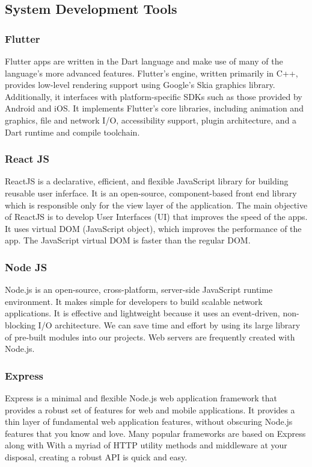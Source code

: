 \newpage
\subsection{System Development Tools}
\subsubsection{Flutter}
Flutter apps are written in the Dart language and make use of many of the language's more advanced features. Flutter's engine, written primarily
in C++, provides low-level rendering support using Google's Skia graphics library. \cite{Flutter}Additionally, it interfaces with platform-specific SDKs such as those provided by Android and iOS. It implements Flutter's core libraries, including animation and graphics, file and network I/O, accessibility support, plugin architecture, and a Dart runtime and compile toolchain.

\subsubsection{React JS}
ReactJS is a declarative, efficient, and flexible JavaScript library for building reusable user inferface. \cite{ReactJS} It is an open-source, component-based front end library which is responsible only for the view layer of the application. The main objective of ReactJS is to develop User Interfaces (UI) that improves the speed of the apps. It uses virtual DOM (JavaScript object), which improves the performance of the app. The JavaScript virtual DOM is faster than the regular DOM.

\subsubsection{Node JS}
Node.js is an open-source, cross-platform, server-side JavaScript runtime environment. It makes simple for developers to build scalable network applications. It is effective and lightweight because it uses an event-driven, non-blocking I/O architecture. We can save time and effort by using its large library of pre-built modules into our projects. Web servers are frequently created with Node.js.

\subsubsection{Express}
Express is a minimal and flexible Node.js web application framework that provides a robust set of features for web and mobile applications. It provides a thin layer of fundamental web application features, without obscuring Node.js features that you know and love. Many popular frameworks are based on Express along with With a myriad of HTTP utility methods and middleware at your disposal, creating a robust API is quick and easy.

